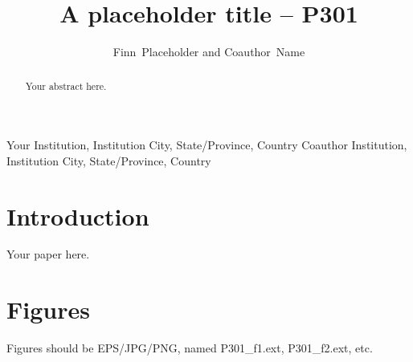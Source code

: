\documentclass[11pt,twoside]{article}
\begin{document}
\title{A placeholder title -- P301}

\author{Finn~Placeholder and Coauthor~Name}
Your Institution, Institution City, State/Province, Country
Coauthor Institution, Institution City, State/Province, Country



\begin{abstract}
Your abstract here.
\end{abstract}

\section{Introduction}

Your paper here.

\section{Figures}

Figures should be EPS/JPG/PNG, named P301\_f1.ext, P301\_f2.ext, etc.

% 
\end{document}
